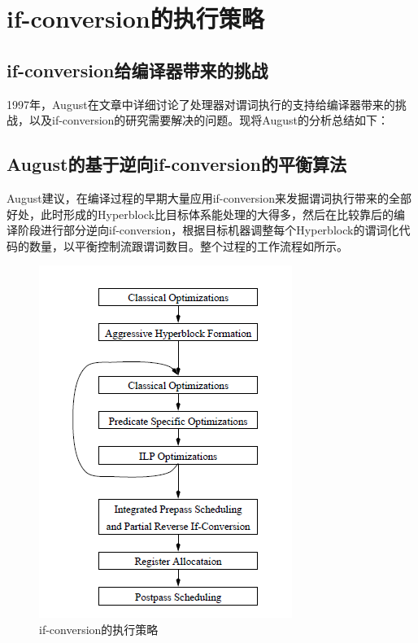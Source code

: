 \section{if-conversion的执行策略}

\subsection{if-conversion给编译器带来的挑战}

1997年，August在文章中详细讨论了处理器对谓词执行的支持给编译器带来的挑战，以及if-conversion的研究需要解决的问题\cite{August1997}。现将August的分析总结如下：



\subsection{August的基于逆向if-conversion的平衡算法}

August建议，在编译过程的早期大量应用if-conversion来发掘谓词执行带来的全部好处，此时形成的Hyperblock比目标体系能处理的大得多，然后在比较靠后的编译阶段进行部分逆向if-conversion，根据目标机器调整每个Hyperblock的谓词化代码的数量，以平衡控制流跟谓词数目。整个过程的工作流程如所示。

\begin{figure}
\includegraphics[width=\linewidth]{ifcvt-framework}
\caption{\label{fig:ifcvtframework} if-conversion的执行策略}
\end{figure}
